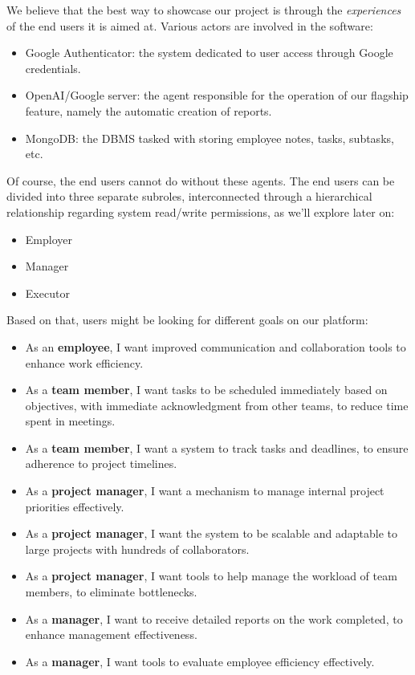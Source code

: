 \documentclass{article}
\begin{document}
We believe that the best way to showcase our project is through the \textit{experiences} of the end users it is aimed at. Various actors are involved in the software:
\begin{itemize}
  \item Google Authenticator: the system dedicated to user access through Google credentials.
  \item OpenAI/Google server: the agent responsible for the operation of our flagship feature, namely the automatic creation of reports.
  \item MongoDB: the DBMS tasked with storing employee notes, tasks, subtasks, etc.
\end{itemize}
Of course, the end users cannot do without these agents. The end users can be divided into three separate subroles, interconnected through a hierarchical relationship regarding system read/write permissions, as we'll explore later on:
\begin{itemize}
  \item Employer
  \item Manager
  \item Executor
\end{itemize}

Based on that, users might be looking for different goals on our platform:
\begin{itemize}
    \item As an \textbf{employee}, I want improved communication and collaboration tools to enhance work efficiency.
    \item As a \textbf{team member}, I want tasks to be scheduled immediately based on objectives, with immediate acknowledgment from other teams, to reduce time spent in meetings.
    \item As a \textbf{team member}, I want a system to track tasks and deadlines, to ensure adherence to project timelines.
    \item As a \textbf{project manager}, I want a mechanism to manage internal project priorities effectively.
    \item As a \textbf{project manager}, I want the system to be scalable and adaptable to large projects with hundreds of collaborators.
    \item As a \textbf{project manager}, I want tools to help manage the workload of team members, to eliminate bottlenecks.
    \item As a \textbf{manager}, I want to receive detailed reports on the work completed, to enhance management effectiveness.
    \item As a \textbf{manager}, I want tools to evaluate employee efficiency effectively.
\end{itemize}
\end{document}
